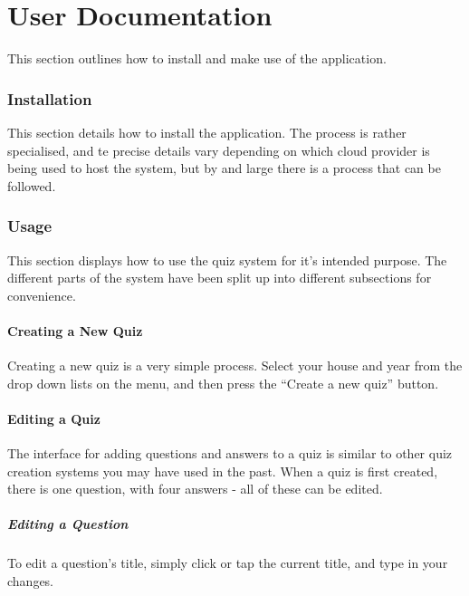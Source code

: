 \clearpage

\part{User Documentation} %
\label{prt:user_ _documentation_}
This section outlines how to install and make use of the application.

\section{Installation} %
\label{sec:installation}
This section details how to install the application. The process is rather specialised, and te precise details vary depending on which cloud provider is being used to host the system, but by and large there is a process that can be followed.

\section{Usage} %
\label{sec:usage}
This section displays how to use the quiz system for it's intended purpose. The different parts of the system have been split up into different subsections for convenience.

\subsection{Creating a New Quiz} %
\label{sub:creating_a_quiz}
Creating a new quiz is a very simple process. Select your house and year from the drop down lists on the menu, and then press the ``Create a new quiz'' button.

\subsection{Editing a Quiz} %
\label{sub:editing_a_quiz}
The interface for adding questions and answers to a quiz is similar to other quiz creation systems you may have used in the past. When a quiz is first created, there is one question, with four answers - all of these can be edited.

\subsubsection{Editing a Question} %
\label{ssub:editing_a_question}
To edit a question's title, simply click or tap the current title, and type in your changes.

